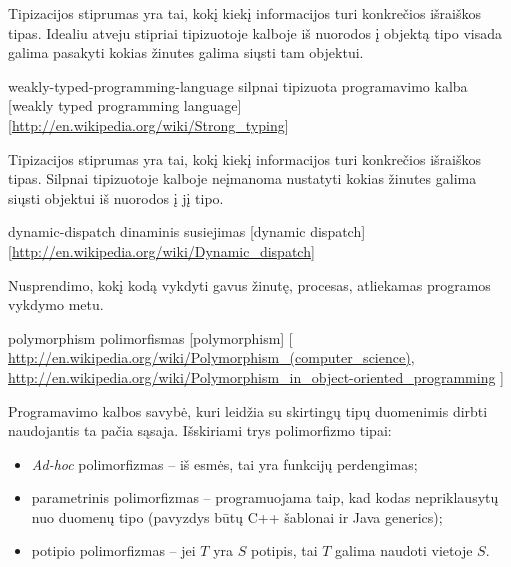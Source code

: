 \begin{glossary}
\begin{entry}
    Tipizacijos stiprumas yra tai, kokį kiekį informacijos turi
    konkrečios išraiškos tipas. Idealiu atveju stipriai tipizuotoje
    kalboje iš nuorodos į objektą tipo visada galima pasakyti kokias
    žinutes galima siųsti tam
    objektui.\cite[1]{Madsen:1990:STO:97946.97964}
    
  \end{entry}

  \begin{entry}%
    {weakly-typed-programming-language}%
    {silpnai tipizuota programavimo kalba}%
    [weakly typed programming language]%
    [\url{http://en.wikipedia.org/wiki/Strong_typing}]

    Tipizacijos stiprumas yra tai, kokį kiekį informacijos turi
    konkrečios išraiškos tipas. Silpnai tipizuotoje kalboje neįmanoma
    nustatyti kokias žinutes galima siųsti objektui iš nuorodos į jį
    tipo.\cite[1]{Madsen:1990:STO:97946.97964}
    
  \end{entry}


  \begin{entry}%
    {dynamic-dispatch}%
    {dinaminis susiejimas}%
    [dynamic dispatch]%
    [\url{http://en.wikipedia.org/wiki/Dynamic_dispatch}]

    Nusprendimo, kokį kodą vykdyti gavus žinutę, procesas,
    atliekamas programos vykdymo metu.

  \end{entry}

  \begin{entry}%
    {polymorphism}%
    {polimorfismas}%
    [polymorphism]%
    [%
    \url{http://en.wikipedia.org/wiki/Polymorphism_(computer_science)}, %
    \url{http://en.wikipedia.org/wiki/Polymorphism_in_object-oriented_programming}%
    ]%

    Programavimo kalbos savybė, kuri leidžia su skirtingų tipų duomenimis
    dirbti naudojantis ta pačia sąsaja. Išskiriami trys polimorfizmo tipai:
    \begin{itemize}
      \item \emph{Ad-hoc} polimorfizmas  –
        iš esmės, tai yra funkcijų perdengimas;
      \item parametrinis polimorfizmas  –
        programuojama taip, kad kodas nepriklausytų nuo duomenų tipo
        (pavyzdys būtų C++ šablonai ir Java generics);
      \item potipio polimorfizmas  – 
        jei $T$ yra $S$ potipis, tai $T$ galima naudoti vietoje $S$.
    \end{itemize}
    
  \end{entry}
\end{glossary}

